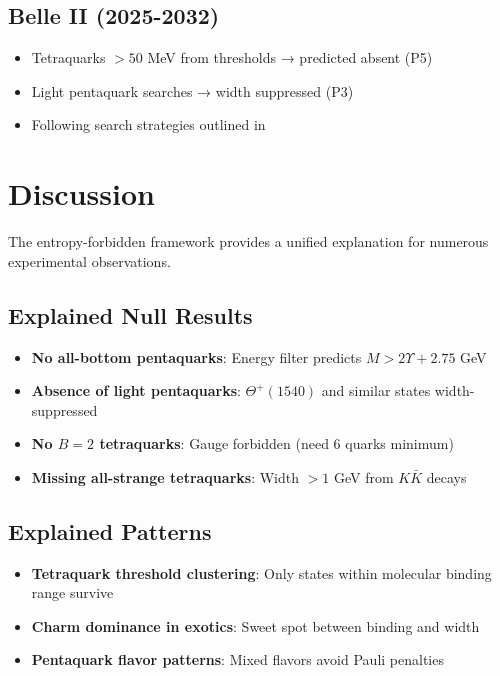\documentclass[12pt,a4paper]{article}
\begin{document}
\subsection{Belle II (2025-2032)}

\begin{itemize}
\item Tetraquarks $>50$ MeV from thresholds → predicted absent (P5)
\item Light pentaquark searches → width suppressed (P3)
\item Following search strategies outlined in~\cite{Brambilla2020}
\end{itemize}

\section{Discussion}

The entropy-forbidden framework provides a unified explanation for numerous experimental observations.

\subsection{Explained Null Results}

\begin{itemize}
\item \textbf{No all-bottom pentaquarks}: Energy filter predicts $M > 2\Upsilon + 2.75$ GeV
\item \textbf{Absence of light pentaquarks}: $\Theta^+(1540)$ and similar states width-suppressed
\item \textbf{No $B=2$ tetraquarks}: Gauge forbidden (need 6 quarks minimum)
\item \textbf{Missing all-strange tetraquarks}: Width $>1$ GeV from $K\bar{K}$ decays
\end{itemize}

\subsection{Explained Patterns}

\begin{itemize}
\item \textbf{Tetraquark threshold clustering}: Only states within molecular binding range survive
\item \textbf{Charm dominance in exotics}: Sweet spot between binding and width
\item \textbf{Pentaquark flavor patterns}: Mixed flavors avoid Pauli penalties
\end{itemize}
\end{document}
